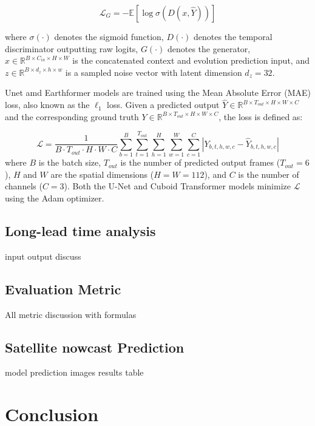 \documentclass{article}
\begin{document}
\begin{itemize}
\begin{equation}
    \mathcal{L}_{G} = -\mathbb{E}\left[\log \sigma(D(x, \hat{Y}))\right]
\end{equation}

where $\sigma(\cdot)$ denotes the sigmoid function, $D(\cdot)$ denotes the temporal discriminator 
outputting raw logits, $G(\cdot)$ denotes the generator, $x \in \mathbb{R}^{B \times C_{in} \times H \times W}$ 
is the concatenated context and evolution prediction input, and $z \in \mathbb{R}^{B \times d_z \times h \times w}$ 
is a sampled noise vector with latent dimension $d_z = 32$.
\end{itemize}

Unet amd Earthformer models are trained using the Mean Absolute Error (MAE) loss, also known as the $\ell_1$ loss. Given a predicted output $\hat{Y} \in \mathbb{R}^{B \times T_{out} \times H \times W \times C}$ and the corresponding ground truth $Y \in \mathbb{R}^{B \times T_{out} \times H \times W \times C}$, the loss is defined as:

\begin{equation}
    \mathcal{L} = \frac{1}{B \cdot T_{out} \cdot H \cdot W \cdot C} \sum_{b=1}^{B} \sum_{t=1}^{T_{out}} \sum_{h=1}^{H} \sum_{w=1}^{W} \sum_{c=1}^{C} \left| Y_{b,t,h,w,c} - \hat{Y}_{b,t,h,w,c} \right|
\end{equation}
where $B$ is the batch size, $T_{out}$ is the number of predicted output frames ($T_{out} = 6$), $H$ and $W$ are the spatial dimensions ($H = W = 112$), and $C$ is the number of channels ($C = 3$). Both the U-Net and Cuboid Transformer models minimize $\mathcal{L}$ using the Adam optimizer.



\subsection{Long-lead time analysis}
input output discuss

\subsection{Evaluation Metric}
All metric discussion with formulas

\subsection{Satellite nowcast Prediction}
model prediction images
results table

\section{Conclusion}
\end{document}
